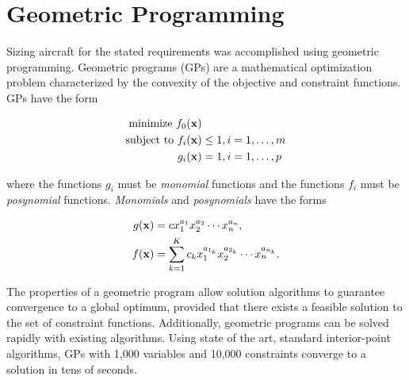 
\DIFdelend \section{Geometric Programming}

Sizing \DIFdelbegin {}\DIFdelend \DIFaddbegin {}\DIFaddend aircraft for the stated requirements was accomplished using geometric programming. 
Geometric programs (GPs) are a mathematical optimization problem characterized by the convexity of the objective and constraint functions.\cite{gp} GPs have the form

\begin{align} 
\label{e:gpform}
\text{minimize } f_0(\bold{x}) & \nonumber \\
\text{subject to  } f_i(\bold{x}) &\leq 1, i=1,\ldots,m \\
g_i (\bold{x}) &= 1, i = 1,\ldots,p 
\end{align}

where the functions $g_i$ must be \emph{monomial} functions and the functions $f_i$ must be \emph{posynomial} functions. \emph{Monomials} and \emph{posynomials} have the forms

\begin{align}
 \label{e:mon}
g(\bold{x}) &= c x_1^{a_1} x_2^{a_2} \dotsm x_n^{a_n} , \\
\label{e:pos}
f(\bold{x}) &= \displaystyle\sum_{k=1}^K c_k x_1^{a_{1_k}} x_2^{a_{2_k}} \dotsm x_n^{a_{n_k}}.
\end{align}

The properties of a geometric program allow solution algorithms to guarantee convergence to a global optimum, provided that there exists a feasible solution to the set of constraint functions.  
Additionally, geometric programs can be solved rapidly with existing algorithms.  
Using state of the art, standard interior-point algorithms, GPs with 1,000 variables and 10,000 constraints converge to a solution in tens of seconds.\cite{gp}  
\DIFdelbegin {}\DIFdelend \DIFaddbegin 

